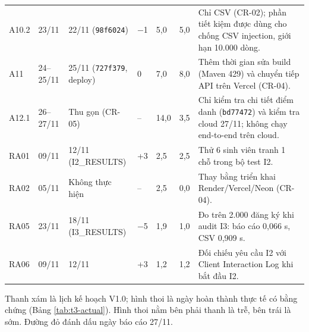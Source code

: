 \begin{longtable}{@{}p{.07\linewidth}p{.11\linewidth}p{.20\linewidth}p{.06\linewidth}p{.06\linewidth}p{.06\linewidth}p{.34\linewidth}@{}}
A10.2 & 23/11 & 22/11 (\texttt{98f6024}) & $-$1 & 5,0 & 5,0 & Chỉ CSV (CR-02); phần tiết kiệm được dùng cho chống CSV injection, giới hạn 10.000 dòng.\\
A11 & 24--25/11 & 25/11 (\texttt{727f379}, deploy) & 0 & 7,0 & 8,0 & Thêm thời gian sửa build (Maven 429) và chuyển tiếp API trên Vercel (CR-04).\\
A12.1 & 26--27/11 & Thu gọn (CR-05) & -- & 14,0 & 3,5 & Chỉ kiểm tra chi tiết điểm danh (\texttt{bd77472}) và kiểm tra cloud 27/11; không chạy end-to-end trên cloud.\\
RA01 & 09/11 & 12/11 (I2\_RESULTS) & +3 & 2,5 & 2,5 & Thử 6 sinh viên tranh 1 chỗ trong bộ test I2.\\
RA02 & 05/11 & Không thực hiện & -- & 2,5 & 0,0 & Thay bằng triển khai Render/Vercel/Neon (CR-04).\\
RA05 & 23/11 & 18/11 (I3\_RESULTS) & $-$5 & 1,9 & 1,0 & Đo trên 2.000 đăng ký khi audit I3: báo cáo 0,066 s, CSV 0,909 s.\\
RA06 & 09/11 & 12/11 & +3 & 1,2 & 1,2 & Đối chiếu yêu cầu I2 với Client Interaction Log khi bắt đầu I2.\\
\end{longtable}
\endgroup


Thanh xám là lịch kế hoạch V1.0; hình thoi là ngày hoàn thành thực tế có bằng chứng (Bảng \ref{tab:t3-actual}). Hình thoi nằm bên phải thanh là trễ, bên trái là sớm. Đường đỏ đánh dấu ngày báo cáo 27/11.


